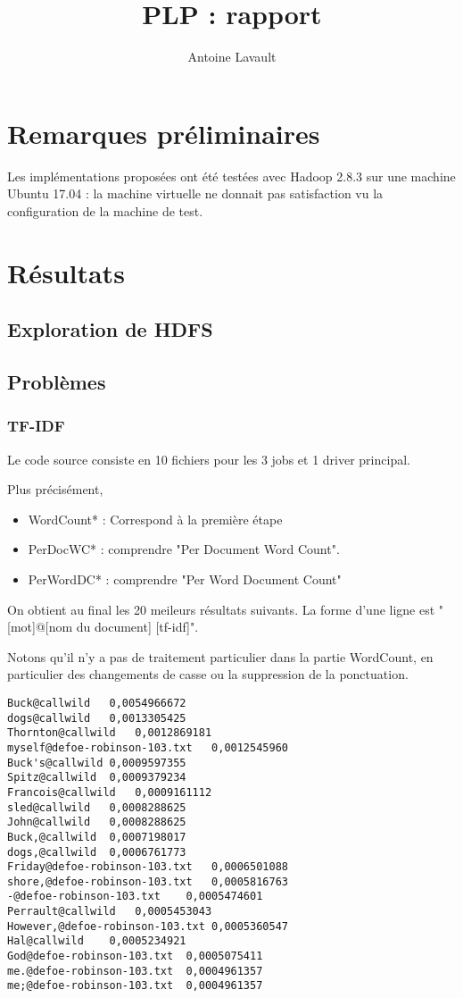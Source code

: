\documentclass[french]{article}
\title{PLP : rapport}
\author{Antoine Lavault}
\begin{document}
\maketitle

\section*{Remarques préliminaires}

Les implémentations proposées ont été testées avec Hadoop 2.8.3 sur une machine Ubuntu 17.04 : la machine virtuelle ne donnait pas satisfaction vu la configuration de la machine de test.

\section{Résultats}
\subsection{Exploration de HDFS}

\subsection{Problèmes}
\subsubsection{TF-IDF}

Le code source consiste en 10 fichiers pour les 3 jobs et 1 driver principal.

Plus précisément,

\begin{itemize}
	\item WordCount* : Correspond à la première étape
	\item PerDocWC* : comprendre "Per Document Word Count".
	\item PerWordDC* : comprendre "Per Word Document Count"
\end{itemize}

On obtient au final les 20 meileurs résultats suivants. La forme d'une ligne est "[mot]@[nom du document]    [tf-idf]".

Notons qu'il n'y a pas de traitement particulier dans la partie WordCount, en particulier des changements de casse ou la suppression de la ponctuation.


\begin{verbatim}
Buck@callwild	0,0054966672
dogs@callwild	0,0013305425
Thornton@callwild	0,0012869181
myself@defoe-robinson-103.txt	0,0012545960
Buck's@callwild	0,0009597355
Spitz@callwild	0,0009379234
Francois@callwild	0,0009161112
sled@callwild	0,0008288625
John@callwild	0,0008288625
Buck,@callwild	0,0007198017
dogs,@callwild	0,0006761773
Friday@defoe-robinson-103.txt	0,0006501088
shore,@defoe-robinson-103.txt	0,0005816763
-@defoe-robinson-103.txt	0,0005474601
Perrault@callwild	0,0005453043
However,@defoe-robinson-103.txt	0,0005360547
Hal@callwild	0,0005234921
God@defoe-robinson-103.txt	0,0005075411
me.@defoe-robinson-103.txt	0,0004961357
me;@defoe-robinson-103.txt	0,0004961357
\end{verbatim}
\end{document}
